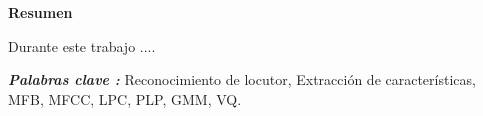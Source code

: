 \setcounter{page}{4}
\begin{center}
	{\bf Resumen}  %
\end{center}	

Durante este trabajo ....

\vspace{15mm}

\textbf{\textit{Palabras clave :}}  Reconocimiento de locutor, Extracci\'on de caracter\'isticas, MFB, MFCC, LPC, PLP, GMM, VQ.